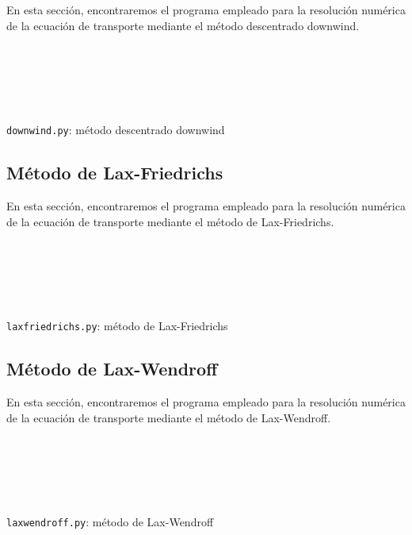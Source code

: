En esta sección, encontraremos el programa empleado para la
resolución numérica de la ecuación de transporte mediante el método
descentrado downwind.

\begin{listing}[ht!]
    \tiny
    \centering
    \inputminted[firstline=1,lastline=2]{python}{downwind.py}
    \inputminted[firstline=4,lastline=7]{python}{downwind.py}
    \inputminted[firstline=10,lastline=11]{python}{downwind.py}
    \inputminted[firstline=14,lastline=33]{python}{downwind.py}
    \inputminted[firstline=35,lastline=35]{python}{downwind.py}
    \inputminted[firstline=38,lastline=42]{python}{downwind.py}
    \inputminted[firstline=45,lastline=53]{python}{downwind.py}
    \caption{\texttt{downwind.py}: método descentrado downwind}
\end{listing}

\clearpage
\subsection{Método de Lax-Friedrichs}

En esta sección, encontraremos el programa empleado para la
resolución numérica de la ecuación de transporte mediante el método
de Lax-Friedrichs.

\begin{listing}[ht!]
    \tiny
    \centering
    \inputminted[firstline=1,lastline=2]{python}{laxfriedrichs.py}
    \inputminted[firstline=4,lastline=7]{python}{laxfriedrichs.py}
    \inputminted[firstline=10,lastline=11]{python}{laxfriedrichs.py}
    \inputminted[firstline=14,lastline=33]{python}{laxfriedrichs.py}
    \inputminted[firstline=35,lastline=35]{python}{laxfriedrichs.py}
    \inputminted[firstline=38,lastline=42]{python}{laxfriedrichs.py}
    \inputminted[firstline=45,lastline=56]{python}{laxfriedrichs.py}
    \caption{\texttt{laxfriedrichs.py}: método de Lax-Friedrichs}
\end{listing}

\clearpage
\subsection{Método de Lax-Wendroff}

En esta sección, encontraremos el programa empleado para la
resolución numérica de la ecuación de transporte mediante el método
de Lax-Wendroff.

\begin{listing}[ht!]
    \tiny
    \centering
    \inputminted[firstline=1,lastline=2]{python}{laxwendroff.py}
    \inputminted[firstline=4,lastline=7]{python}{laxwendroff.py}
    \inputminted[firstline=10,lastline=11]{python}{laxwendroff.py}
    \inputminted[firstline=14,lastline=33]{python}{laxwendroff.py}
    \inputminted[firstline=35,lastline=35]{python}{laxwendroff.py}
    \inputminted[firstline=38,lastline=42]{python}{laxwendroff.py}
    \inputminted[firstline=45,lastline=56]{python}{laxwendroff.py}
    \caption{\texttt{laxwendroff.py}: método de Lax-Wendroff}
\end{listing}